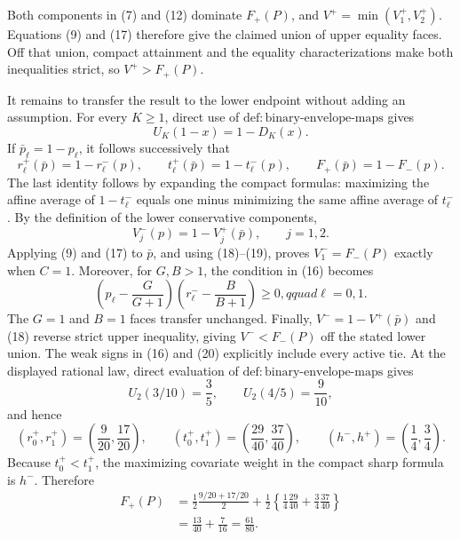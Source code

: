 Both components in (7) and (12) dominate \(F_+(P)\), and
\(V^+=\min(V_1^+,V_2^+)\).  Equations (9) and (17) therefore give the
claimed union of upper equality faces.  Off that union, compact
attainment and the equality characterizations make both inequalities
strict, so \(V^+>F_+(P)\).

It remains to transfer the result to the lower endpoint without adding
an assumption.  For every \(K\geq1\), direct use of
\(\mathrm{def{:}binary\text{-}envelope\text{-}maps}\) gives
\[
 U_K(1-x)=1-D_K(x).
\]
If \(\bar p_\ell=1-p_\ell\), it follows successively that
\[
 r_\ell^+(\bar p)=1-r_\ell^-(p),\qquad
 t_\ell^+(\bar p)=1-t_\ell^-(p),\qquad
 F_+(\bar p)=1-F_-(p).                                        \tag{18}
\]
The last identity follows by expanding the compact formulas: maximizing
the affine average of \(1-t_\ell^-\) equals one minus minimizing the
same affine average of \(t_\ell^-\).  By the definition of the lower
conservative components,
\[
 V_j^-(p)=1-V_j^+(\bar p),\qquad j=1,2.                        \tag{19}
\]
Applying (9) and (17) to \(\bar p\), and using (18)--(19), proves
\(V_1^-=F_-(P)\) exactly when \(C=1\).  Moreover, for \(G,B>1\), the
condition in (16) becomes
\[
 \left(p_\ell-\frac{G}{G+1}\right)
 \left(r_\ell^--\frac{B}{B+1}\right)\geq0,qquad \ell=0,1.    \tag{20}
\]
The \(G=1\) and \(B=1\) faces transfer unchanged.  Finally,
\(V^-=1-V^+(\bar p)\) and (18) reverse strict upper inequality, giving
\(V^-<F_-(P)\) off the stated lower union.  The weak signs in
(16) and (20) explicitly include every active tie.
At the displayed rational law, direct evaluation of
\(\mathrm{def{:}binary\text{-}envelope\text{-}maps}\) gives
\[
 U_2(3/10)=\frac35,\qquad U_2(4/5)=\frac9{10},
\]
and hence
\[
 (r_0^+,r_1^+)=\left(\frac9{20},\frac{17}{20}\right),\qquad
 (t_0^+,t_1^+)=\left(\frac{29}{40},\frac{37}{40}\right),
 \qquad (h^-,h^+)=\left(\frac14,\frac34\right).               \tag{21}
\]
Because \(t_0^+<t_1^+\), the maximizing covariate weight in the compact
sharp formula is \(h^-\).  Therefore
\[
 \begin{aligned}
 F_+(P)
 &=\frac12\frac{9/20+17/20}{2}
   +\frac12\left\{\frac14\frac{29}{40}
                    +\frac34\frac{37}{40}\right\}\\
 &=\frac{13}{40}+\frac7{16}=\frac{61}{80}.                    \tag{22}
 \end{aligned}
\]

